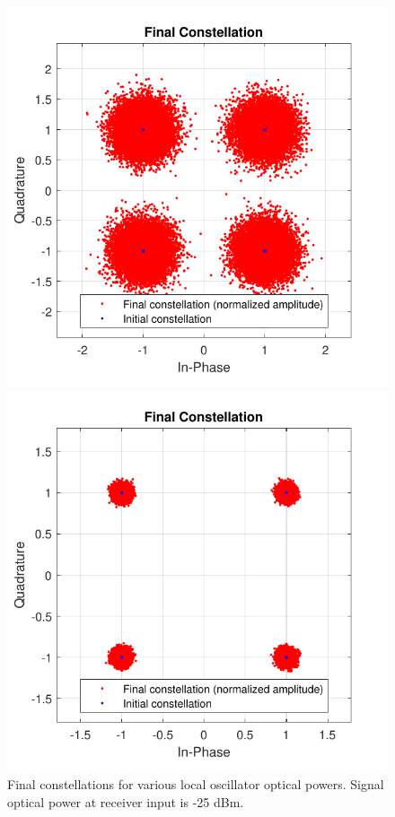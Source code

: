 \begin{figure}[h]
\begin{minipage}{0.33\textwidth}
	\end{minipage}
	\begin{minipage}{0.33\textwidth}
		\centering
		\includegraphics[width=1\textwidth]{sdf/m_qam_system/figures/simulations/04_incLO/constNorm_lo6dBm.pdf}
	\end{minipage}
	\begin{minipage}{0.33\textwidth}
		\centering
		\includegraphics[width=1\textwidth]{sdf/m_qam_system/figures/simulations/04_incLO/constNorm_lo20dBm.pdf}
	\end{minipage}
	\caption{Final constellations for various local oscillator optical 
		powers. Signal optical power at receiver input is -25 
		dBm.}\label{fig:sim_loVarConsts}
\end{figure}

